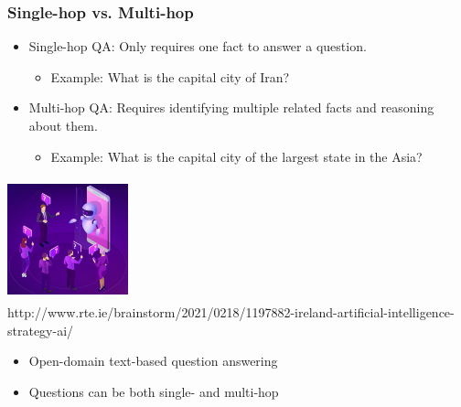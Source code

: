 \documentclass[]{beamer}
\begin{document}
\begin{frame}
\frametitle{Single-hop vs. Multi-hop} 

\begin{itemize}

\item<1-> Single-hop QA: Only requires one fact to answer a question.
  \begin{itemize}
	 \item<2-> Example: What is the capital city of Iran?
  \end{itemize}

  
\item<3-> Multi-hop QA: Requires identifying multiple related facts and reasoning about them.
\begin{itemize}
	 \item<4-> Example: What is the capital city of the largest state in the Asia?  
  \end{itemize}
  
  \end{itemize}
  
  
\end{frame}


\begin{frame}

\begin{minipage}{4cm}
\includegraphics[height=3.5cm, width=3.5cm]{2.jpg} \\
\centering 
\tiny{ {\color{gray} http://www.rte.ie/brainstorm/2021/0218/1197882-ireland-artificial-intelligence-strategy-ai/}}

\end{minipage}%
\begin{minipage}{7cm}
\begin{itemize}
\item Open-domain text-based question answering 
\item Questions can be both single- and multi-hop
\end{itemize}
\end{minipage}

\end{frame}
\end{document}
